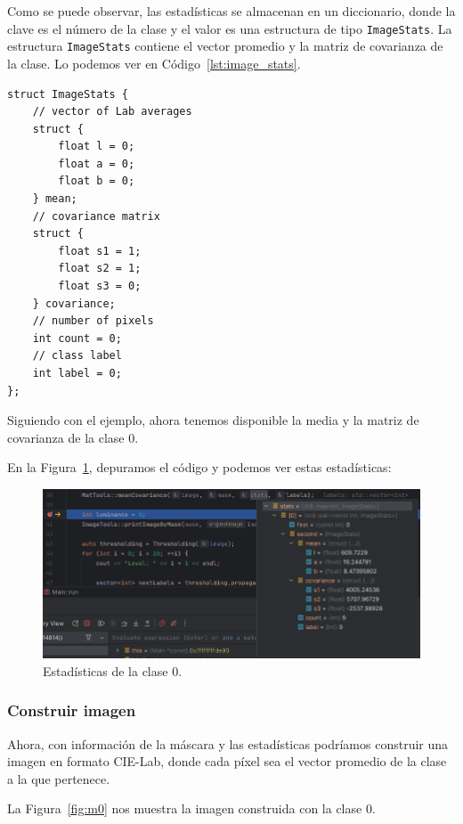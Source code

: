 Como se puede observar, las estadísticas se almacenan en un diccionario, donde la clave es el número de la clase y el valor es una estructura de tipo \texttt{ImageStats}.
La estructura \texttt{ImageStats} contiene el vector promedio y la matriz de covarianza de la clase.
Lo podemos ver en Código~\ref{lst:image_stats}.
\begin{lstlisting}[float=H,caption={Image Stats},label={lst:image_stats}]
struct ImageStats {
    // vector of Lab averages
    struct {
        float l = 0;
        float a = 0;
        float b = 0;
    } mean;
    // covariance matrix
    struct {
        float s1 = 1;
        float s2 = 1;
        float s3 = 0;
    } covariance;
    // number of pixels
    int count = 0;
    // class label
    int label = 0;
};
\end{lstlisting}

Siguiendo con el ejemplo, ahora tenemos disponible la media y la matriz de covarianza de la clase 0.

En la Figura~\ref{fig:stats_0}, depuramos el código y podemos ver estas estadísticas:

\begin{figure}[H]
    \centering
    \includegraphics[width=1\textwidth]{./latex/img/stats_0}
    \caption{Estadísticas de la clase 0.}
    \label{fig:stats_0}
\end{figure}

\subsubsection{Construir imagen}\label{subsubsec:build-image}

Ahora, con información de la máscara y las estadísticas podríamos construir una imagen en formato CIE-Lab, donde cada píxel sea el vector promedio de la clase a la que pertenece.

La Figura~\ref{fig:m0} nos muestra la imagen construida con la clase 0.


